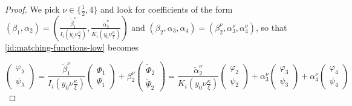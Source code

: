 \documentclass[11 pt]{amsart}
\theoremstyle{definition}
\theoremstyle{remark}
\numberwithin{equation}{section}
\begin{document}
\begin{proof}
We pick $\nu\in \{\frac 12,4\}$ and look for coefficients of the form $(\beta_1,\alpha_2)=(\frac{\widetilde \beta^{\nu}_1}{I_i \left(y_0 \nu \frac{\kappa}{\xi} \right)}, \frac{\widetilde \alpha^{\nu}_2}{K_i \left(y_0 \nu \frac{\kappa}{\xi} \right)})$ and $(\beta_2,\alpha_3,\alpha_4)=(\beta_2^\nu,\alpha_3^\nu,\alpha_4^\nu)$, so that \eqref{id:matching-functions-low} becomes

\begin{equation} \label{id:matching-functions-low-2}\left(\begin{array}{c}
       \varphi_{\lambda}\\
       \psi_{\lambda}
     \end{array}\right) = \frac{\widetilde \beta^{\nu}_1}{I_i \left(y_0 \nu
     \frac{\kappa}{\xi} \right)} \left(\begin{array}{c}
       \Phi_1\\
       \Psi_1
     \end{array}\right) + \beta^{\nu}_2 \left(\begin{array}{c}
       \widetilde{\Phi}_2\\
       \widetilde{\Psi}_2
     \end{array}\right) = \frac{\widetilde \alpha^{\nu}_2}{K_i \left(y_0 \nu
     \frac{\kappa}{\xi} \right)} \left(\begin{array}{c}
       \varphi_2\\
       \psi_2
     \end{array}\right) + \alpha^{\nu}_3 \left(\begin{array}{c}
       \varphi_3\\
       \psi_3
     \end{array}\right) + \alpha^{\nu}_4 \left(\begin{array}{c}
       \varphi_4\\
       \psi_4
     \end{array}\right) 
\end{equation}


\end{proof}
\end{document}
